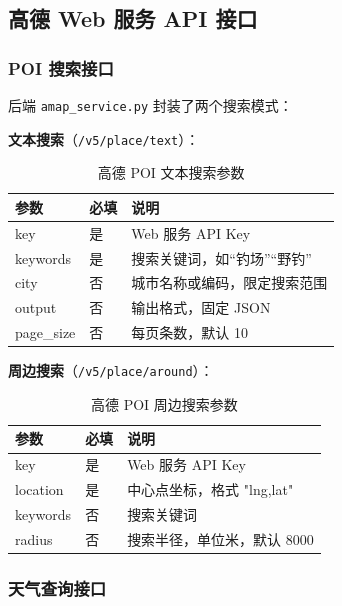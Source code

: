 \documentclass[12pt,a4paper]{ctexart}
\begin{document}
\subsection{高德 Web 服务 API 接口}

\subsubsection{POI 搜索接口}

后端 \texttt{amap\_service.py} 封装了两个搜索模式：

\textbf{文本搜索}（\texttt{/v5/place/text}）：
\begin{table}[H]
  \centering
  \caption{高德 POI 文本搜索参数}
  \label{tab:amap-text-search}
  \begin{tabular}{p{2.5cm}p{2cm}p{7.5cm}}
    \toprule
    \textbf{参数} & \textbf{必填} & \textbf{说明} \\
    \midrule
    key & 是 & Web 服务 API Key \\
    keywords & 是 & 搜索关键词，如“钓场”“野钓” \\
    city & 否 & 城市名称或编码，限定搜索范围 \\
    output & 否 & 输出格式，固定 JSON \\
    page\_size & 否 & 每页条数，默认 10 \\
    \bottomrule
  \end{tabular}
\end{table}

\textbf{周边搜索}（\texttt{/v5/place/around}）：
\begin{table}[H]
  \centering
  \caption{高德 POI 周边搜索参数}
  \label{tab:amap-around-search}
  \begin{tabular}{p{2.5cm}p{2cm}p{7.5cm}}
    \toprule
    \textbf{参数} & \textbf{必填} & \textbf{说明} \\
    \midrule
    key & 是 & Web 服务 API Key \\
    location & 是 & 中心点坐标，格式 "lng,lat" \\
    keywords & 否 & 搜索关键词 \\
    radius & 否 & 搜索半径，单位米，默认 8000 \\
    \bottomrule
  \end{tabular}
\end{table}

\subsubsection{天气查询接口}
\end{document}
